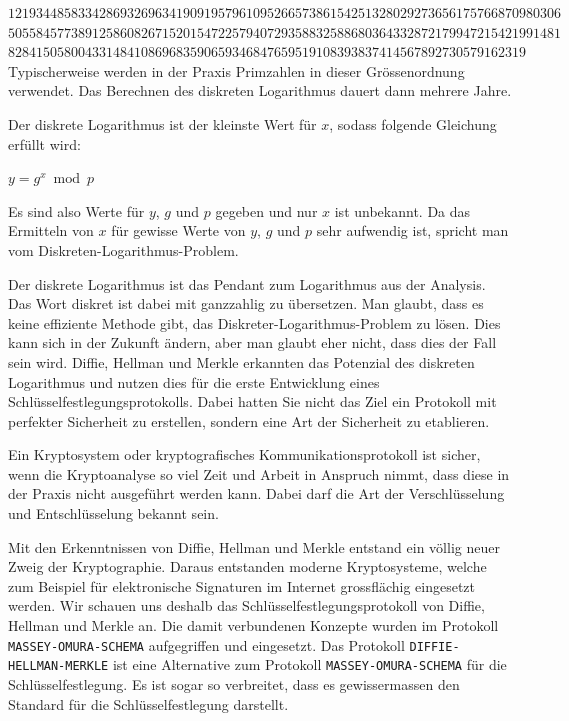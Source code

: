 $1219344858334286932696341909195796109526657386154251328029273656175766870980306$\\
$5055845773891258608267152015472257940729358832588680364332872179947215421991481$\\
$82841505800433148410869683590659346847659519108393837414567892730579162319$\\

Typischerweise werden in der Praxis Primzahlen in dieser Grössenordnung verwendet. Das Berechnen des diskreten Logarithmus dauert dann mehrere Jahre.

\begin{definition}
	Der diskrete Logarithmus ist der kleinste Wert für $x$, sodass folgende Gleichung erfüllt wird:
	
\begin{center}
	$y = g^x \bmod p$
\end{center}

Es sind also Werte für $y$, $g$ und $p$ gegeben und nur $x$ ist unbekannt. Da das Ermitteln von $x$ für gewisse Werte von $y$, $g$ und $p$ sehr aufwendig ist, spricht man vom Diskreten-Logarithmus-Problem.
	
\end{definition}

Der diskrete Logarithmus ist das Pendant zum Logarithmus aus der Analysis. Das Wort diskret ist dabei mit ganzzahlig zu übersetzen. Man glaubt, dass es keine effiziente Methode gibt, das Diskreter-Logarithmus-Problem zu lösen. Dies kann sich in der Zukunft ändern, aber man glaubt eher nicht, dass dies der Fall sein wird. Diffie, Hellman und Merkle erkannten das Potenzial des diskreten Logarithmus und nutzen dies für die erste Entwicklung eines Schlüsselfestlegungsprotokolls. Dabei hatten Sie nicht das Ziel ein Protokoll mit perfekter Sicherheit zu erstellen, sondern eine  Art der Sicherheit zu etablieren.\\

\begin{definition}
	Ein Kryptosystem oder kryptografisches Kommunikationsprotokoll ist sicher, wenn die Kryptoanalyse so viel Zeit und Arbeit in Anspruch nimmt, dass diese in der Praxis nicht ausgeführt werden kann. Dabei darf die Art der Verschlüsselung und Entschlüsselung bekannt sein.
\end{definition}

Mit den Erkenntnissen von Diffie, Hellman und Merkle entstand ein völlig neuer Zweig der Kryptographie. Daraus entstanden moderne Kryptosysteme, welche zum Beispiel für elektronische Signaturen im Internet grossflächig eingesetzt werden. Wir schauen uns deshalb das Schlüsselfestlegungsprotokoll von Diffie, Hellman und Merkle an. Die damit verbundenen Konzepte wurden im Protokoll \texttt{MASSEY-OMURA-SCHEMA} aufgegriffen und eingesetzt. Das Protokoll \texttt{DIFFIE-HELLMAN-MERKLE} ist eine Alternative zum Protokoll \texttt{MASSEY-OMURA-SCHEMA} für die Schlüsselfestlegung. Es ist sogar so verbreitet, dass es gewissermassen den Standard für die Schlüsselfestlegung darstellt.


